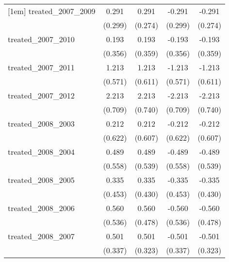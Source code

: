 {\begin{tabular}{l*{4}{c}}
[1em]
treated\_2007\_2009&       0.291         &       0.291         &      -0.291         &      -0.291         \\
            &     (0.299)         &     (0.274)         &     (0.299)         &     (0.274)         \\
[1em]
treated\_2007\_2010&       0.193         &       0.193         &      -0.193         &      -0.193         \\
            &     (0.356)         &     (0.359)         &     (0.356)         &     (0.359)         \\
[1em]
treated\_2007\_2011&       1.213\sym{*}  &       1.213\sym{*}  &      -1.213\sym{*}  &      -1.213\sym{*}  \\
            &     (0.571)         &     (0.611)         &     (0.571)         &     (0.611)         \\
[1em]
treated\_2007\_2012&       2.213\sym{**} &       2.213\sym{**} &      -2.213\sym{**} &      -2.213\sym{**} \\
            &     (0.709)         &     (0.740)         &     (0.709)         &     (0.740)         \\
[1em]
treated\_2008\_2003&       0.212         &       0.212         &      -0.212         &      -0.212         \\
            &     (0.622)         &     (0.607)         &     (0.622)         &     (0.607)         \\
[1em]
treated\_2008\_2004&       0.489         &       0.489         &      -0.489         &      -0.489         \\
            &     (0.558)         &     (0.539)         &     (0.558)         &     (0.539)         \\
[1em]
treated\_2008\_2005&       0.335         &       0.335         &      -0.335         &      -0.335         \\
            &     (0.453)         &     (0.430)         &     (0.453)         &     (0.430)         \\
[1em]
treated\_2008\_2006&       0.560         &       0.560         &      -0.560         &      -0.560         \\
            &     (0.536)         &     (0.478)         &     (0.536)         &     (0.478)         \\
[1em]
treated\_2008\_2007&       0.501         &       0.501         &      -0.501         &      -0.501         \\
            &     (0.337)         &     (0.323)         &     (0.337)         &     (0.323)         \\

\end{tabular}}
